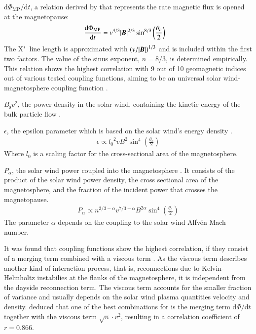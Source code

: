\begin{itemize*}
	\item $\text{d}\Phi_\text{MP} / \text{d}t$, a relation derived by \citet{Newell2007} that represents the rate magnetic flux is opened at the magnetopause:
	\begin{align}
		\frac{\text{d}\Phi_\text{MP}}{\text{d}t} &= v^{4/3} |\boldsymbol{B}|^{2/3} \sin^{8/3}\left(\frac{\theta_c}{2}\right)	\label{eq:newell_merging_function}
	\end{align}
	The X"~line length is approximated with $\left(v / |\boldsymbol{B}|\right)^{1/3}$ and is included within the first two factors. The value of the sinus exponent, $n = 8/3$, is determined empirically. This relation shows the highest correlation with 9 out of 10 geomagnetic indices out of various tested coupling functions, aiming to be an universal solar wind-magnetosphere coupling function \citep{Newell2007}.
	
	\item $B_\text{s} v^2$, the power density in the solar wind, containing the kinetic energy of the bulk particle flow \citep{Lockwood2013}.
	
	\item $\epsilon$, the epsilon parameter which is based on the solar wind's energy density \citep{Lockwood2013}.
	\begin{align}
		\epsilon \propto {l_0}^2 v B^2 \sin^4\left(\frac{\theta_c}{2}\right)
	\end{align}
	Where $l_0$ is a scaling factor for the cross-sectional area of the magnetosphere.
	
	\item $P_\alpha$, the solar wind power coupled into the magnetosphere \citep{Lockwood2013}. It consists of the product of the solar wind power density, the cross sectional area of the magnetosphere, and the fraction of the incident power that crosses the magnetopause.
	\begin{align}
		P_\alpha \propto n^{2/3 - \alpha} v^{7/3 - \alpha} B^{2 \alpha} \sin^4\left(\frac{\theta_c}{2}\right)
	\end{align}
	The parameter $\alpha$ depends on the coupling to the solar wind Alfvén Mach number.
	
\end{itemize*}

It was found that coupling functions show the highest correlation, if they consist of a merging term combined with a viscous term \citep{Newell2008}. As the viscous term describes another kind of interaction process, that is, reconnections due to Kelvin-Helmholtz instabilies at the flanks of the magnetosphere, it is independent from the dayside reconnection term. The viscous term accounts for the smaller fraction of variance and usually depends on the solar wind plasma quantities velocity and density. \citet{Newell2008} deduced that one of the best combinations for \Kp{} is the merging term $\text{d}\Phi / \text{d}t$ together with the viscous term $\sqrt{n} \cdot v^2$, resulting in a correlation coefficient of $r = 0.866$.

